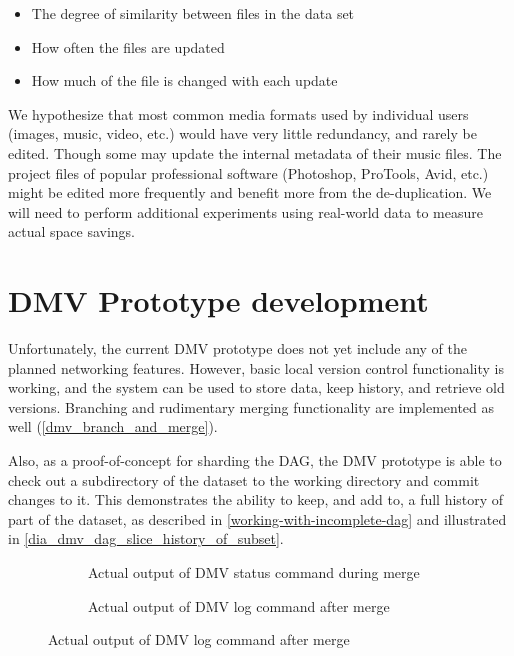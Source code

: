 \begin{itemize}

    \item The degree of similarity between files in the data set

    \item How often the files are updated

    \item How much of the file is changed with each update

\end{itemize}

We hypothesize that most common media formats used by individual users (images,
music, video, etc.) would have very little redundancy, and rarely be edited.
Though some may update the internal metadata of their music files. The project
files of popular professional software (Photoshop, ProTools, Avid, etc.) might
be edited more frequently and benefit more from the de-duplication. We will need
to perform additional experiments using real-world data to measure actual space
savings.

%


\section{DMV Prototype development}

Unfortunately, the current \gls{DMV} prototype does not yet include any of the
planned networking features. However, basic local version control functionality
is working, and the system can be used to store data, keep history, and retrieve
old versions. Branching and rudimentary merging functionality are implemented as
well (\autoref{dmv_branch_and_merge}).

Also, as a proof-of-concept for sharding the DAG, the \gls{DMV} prototype is
able to check out a subdirectory of the dataset to the working directory and
commit changes to it. This demonstrates the ability to keep, and add to, a full
history of part of the dataset, as described in
\autoref{working-with-incomplete-dag} and illustrated in
\autoref{dia_dmv_dag_slice_history_of_subset}.

\begin{figure}[ht]
    \caption{DMV branching and merging functionality}
    \label{dmv_branch_and_merge}
    \centering

    \begin{subfigure}[]{\textwidth}
        \caption{Actual output of DMV status command during merge}
        \label{lst_dmv_merge_in_progress}
        \centering
    \end{subfigure}

    \begin{subfigure}[]{\textwidth}
        \caption{Actual output of DMV log command after merge}
        \label{lst_dmv_log_output}
        \centering
    \end{subfigure}
\end{figure}

